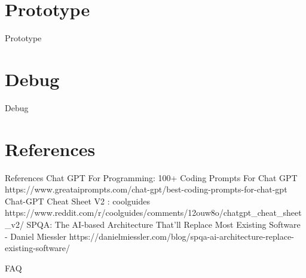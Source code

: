 \documentclass{beamer}
\begin{document}
\section{Prototype}
\begin{frame}{Prototype}
\end{frame}

\section{Debug}
\begin{frame}{Debug}
\end{frame}


\section{References}
\begin{frame}{References}
  Chat GPT For Programming: 100+ Coding Prompts For Chat GPT
  https://www.greataiprompts.com/chat-gpt/best-coding-prompts-for-chat-gpt
  Chat-GPT Cheat Sheet V2 : coolguides
  https://www.reddit.com/r/coolguides/comments/12ouw8o/chatgpt_cheat_sheet_v2/
  SPQA: The AI-based Architecture That'll Replace Most Existing Software - Daniel Miessler
  https://danielmiessler.com/blog/spqa-ai-architecture-replace-existing-software/

\end{frame}


\begin{frame}{FAQ}

\end{frame}
\end{document}
